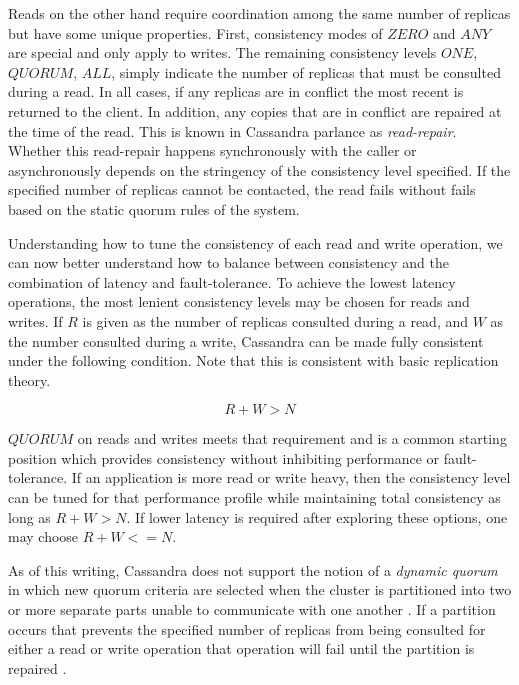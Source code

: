 \documentclass[twocolumn]{article}
\begin{document}
Reads on the other hand require coordination among the same number of replicas but have some unique properties.  First, consistency modes of $ZERO$ and $ANY$ are special and only apply to writes.  The remaining consistency levels $ONE$, $QUORUM$, $ALL$, simply indicate the number of replicas that must be consulted during a read.  In all cases, if any replicas are in conflict the most recent is returned to the client.  In addition, any copies that are in conflict are repaired at the time of the read.  This is known in Cassandra parlance as \emph{read-repair}.  Whether this read-repair happens synchronously with the caller or asynchronously depends on the stringency of the consistency level specified.  If the specified number of replicas cannot be contacted, the read fails without fails based on the static quorum rules of the system.

Understanding how to tune the consistency of each read and write operation, we can now better understand how to balance between consistency and the combination of latency and fault-tolerance.  To achieve the lowest latency operations, the most lenient consistency levels may be chosen for reads and writes. If $R$ is given as the number of replicas consulted during a read, and $W$ as the number consulted during a write, Cassandra can be made fully consistent under the following condition.  Note that this is consistent with basic replication theory.

\begin{equation}\label{eq:consistency}
  R + W > N
\end{equation}

$QUORUM$ on reads and writes meets that requirement and is a common starting position which provides consistency without inhibiting performance or fault-tolerance.  If an application is more read or write heavy, then the consistency level can be tuned for that performance profile while maintaining total consistency as long as $R + W > N$.  If lower latency is required after exploring these options, one may choose $R + W <= N$.

As of this writing, Cassandra does not support the notion of a \emph{dynamic quorum} in which new quorum criteria are selected when the cluster is partitioned into two or more separate parts unable to communicate with one another \cite{ref:source,ref:cwiki}.  If a partition occurs that prevents the specified number of replicas from being consulted for either a read or write operation that operation will fail until the partition is repaired \cite{ref:cdk}.
\end{document}

